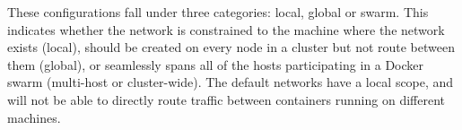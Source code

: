 These configurations fall under three categories: local, global or swarm. This indicates whether the network is constrained to the machine where the network exists (local), should be created on every node in a cluster but not route between them (global), or seamlessly spans all of the hosts participating in a Docker swarm (multi-host or cluster-wide)\cite{Poulton2020-ju}. The default networks have a local scope, and will not be able to directly route traffic between containers running on different machines\cite{network-drivers}.